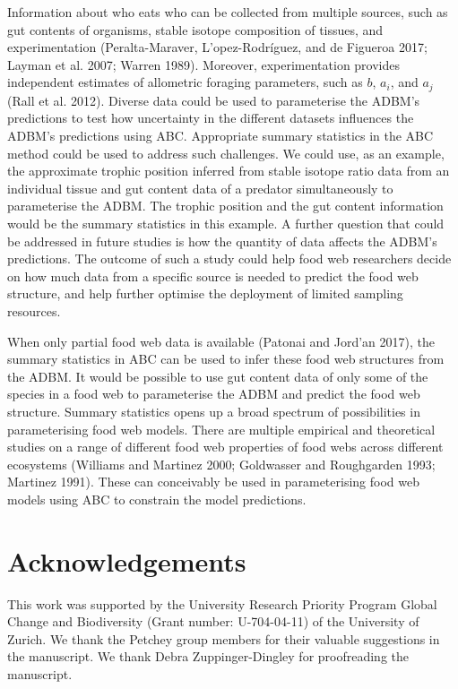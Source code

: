 \documentclass{article}
\begin{document}
Information about who eats who can be collected from multiple sources,
such as gut contents of organisms, stable isotope composition of
tissues, and experimentation (Peralta-Maraver, L\a'opez-Rodríguez, and
de Figueroa 2017; Layman et al. 2007; Warren 1989). Moreover,
experimentation provides independent estimates of allometric foraging
parameters, such as \(b\), \(a_i\), and \(a_j\) (Rall et al. 2012).
Diverse data could be used to parameterise the ADBM's predictions to
test how uncertainty in the different datasets influences the ADBM's
predictions using ABC. Appropriate summary statistics in the ABC method
could be used to address such challenges. We could use, as an example,
the approximate trophic position inferred from stable isotope ratio data
from an individual tissue and gut content data of a predator
simultaneously to parameterise the ADBM. The trophic position and the
gut content information would be the summary statistics in this example.
A further question that could be addressed in future studies is how the
quantity of data affects the ADBM's predictions. The outcome of such a
study could help food web researchers decide on how much data from a
specific source is needed to predict the food web structure, and help
further optimise the deployment of limited sampling resources.

When only partial food web data is available (Patonai and Jord\a'an
2017), the summary statistics in ABC can be used to infer these food web
structures from the ADBM. It would be possible to use gut content data
of only some of the species in a food web to parameterise the ADBM and
predict the food web structure. Summary statistics opens up a broad
spectrum of possibilities in parameterising food web models. There are
multiple empirical and theoretical studies on a range of different food
web properties of food webs across different ecosystems (Williams and
Martinez 2000; Goldwasser and Roughgarden 1993; Martinez 1991). These
can conceivably be used in parameterising food web models using ABC to
constrain the model predictions.

\hypertarget{acknowledgements}{%
\section{Acknowledgements}\label{acknowledgements}}

This work was supported by the University Research Priority Program
Global Change and Biodiversity (Grant number: U-704-04-11) of the
University of Zurich. We thank the Petchey group members for their
valuable suggestions in the manuscript. We thank Debra Zuppinger-Dingley
for proofreading the manuscript.
\end{document}
